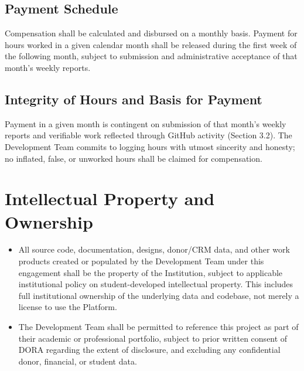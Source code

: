 \documentclass[11pt]{article}
\begin{document}
\subsection{Payment Schedule}
Compensation shall be calculated and disbursed on a monthly basis. Payment for hours worked in a given calendar month shall be released during the first week of the following month, subject to submission and administrative acceptance of that month's weekly reports.

\subsection{Integrity of Hours and Basis for Payment}
Payment in a given month is contingent on submission of that month's weekly reports and verifiable work reflected through GitHub activity (Section 3.2). The Development Team commits to logging hours with utmost sincerity and honesty; no inflated, false, or unworked hours shall be claimed for compensation.

\section{Intellectual Property and Ownership}
\begin{itemize}[leftmargin=1.4em, itemsep=3pt]
\item All source code, documentation, designs, donor/CRM data, and other work products created or populated by the Development Team under this engagement shall be the property of the Institution, subject to applicable institutional policy on student-developed intellectual property. This includes full institutional ownership of the underlying data and codebase, not merely a license to use the Platform.
\item The Development Team shall be permitted to reference this project as part of their academic or professional portfolio, subject to prior written consent of DORA regarding the extent of disclosure, and excluding any confidential donor, financial, or student data.
\end{itemize}

\end{document}
